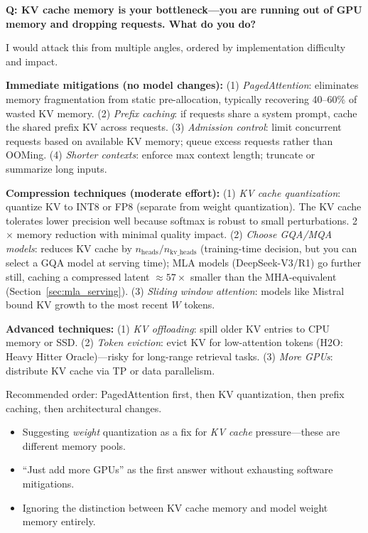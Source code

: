 \begin{interviewq}
\textbf{Q: KV cache memory is your bottleneck---you are running out of GPU memory and dropping requests. What do you do?}

 \quad {} \quad \badgefreq{\freqhigh}

\stronganswer

I would attack this from multiple angles, ordered by implementation difficulty and impact.

\textbf{Immediate mitigations (no model changes):} (1) \textit{PagedAttention}: eliminates memory fragmentation from static pre-allocation, typically recovering 40--60\% of wasted KV memory. (2) \textit{Prefix caching}: if requests share a system prompt, cache the shared prefix KV across requests. (3) \textit{Admission control}: limit concurrent requests based on available KV memory; queue excess requests rather than OOMing. (4) \textit{Shorter contexts}: enforce max context length; truncate or summarize long inputs.

\textbf{Compression techniques (moderate effort):} (1) \textit{KV cache quantization}: quantize KV to INT8 or FP8 (separate from weight quantization). The KV cache tolerates lower precision well because softmax is robust to small perturbations. 2$\times$ memory reduction with minimal quality impact. (2) \textit{Choose GQA/MQA models}: reduces KV cache by $n_{\text{heads}} / n_{\text{kv\_heads}}$ (training-time decision, but you can select a GQA model at serving time); MLA models (DeepSeek-V3/R1) go further still, caching a compressed latent $\approx 57\times$ smaller than the MHA-equivalent (Section~\ref{sec:mla_serving}). (3) \textit{Sliding window attention}: models like Mistral bound KV growth to the most recent $W$ tokens.

\textbf{Advanced techniques:} (1) \textit{KV offloading}: spill older KV entries to CPU memory or SSD. (2) \textit{Token eviction}: evict KV for low-attention tokens (H2O: Heavy Hitter Oracle)---risky for long-range retrieval tasks. (3) \textit{More GPUs}: distribute KV cache via TP or data parallelism.

Recommended order: PagedAttention first, then KV quantization, then prefix caching, then architectural changes.

\redflags
\begin{itemize}
    \item Suggesting \textit{weight} quantization as a fix for \textit{KV cache} pressure---these are different memory pools.
    \item ``Just add more GPUs'' as the first answer without exhausting software mitigations.
    \item Ignoring the distinction between KV cache memory and model weight memory entirely.
\end{itemize}


\end{interviewq}
